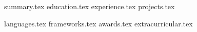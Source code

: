 \documentclass[letterpaper,11pt]{article}
\begin{document}

{summary.tex}
{education.tex}
{experience.tex}
{projects.tex}

\sidebyside
    {{languages.tex}}
    {{frameworks.tex}}
{awards.tex}
{extracurricular.tex}
\end{document}
